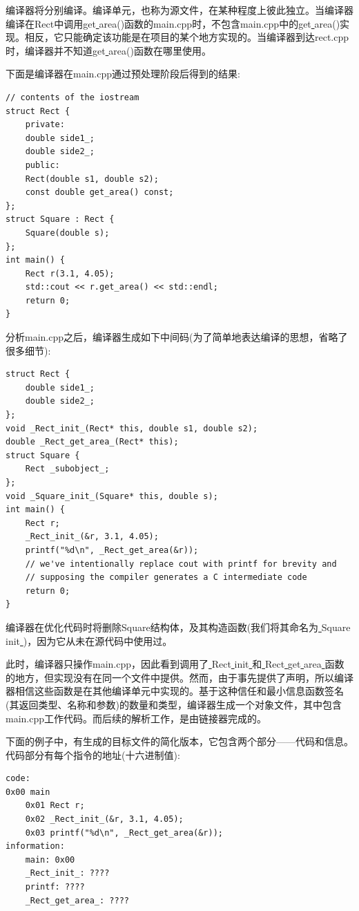 编译器将分别编译。编译单元，也称为源文件，在某种程度上彼此独立。当编译器编译在Rect中调用get\underline{ }area()函数的main.cpp时，不包含main.cpp中的get\underline{ }area()实现。相反，它只能确定该功能是在项目的某个地方实现的。当编译器到达rect.cpp时，编译器并不知道get\underline{ }area()函数在哪里使用。\par
下面是编译器在main.cpp通过预处理阶段后得到的结果: \par

\begin{lstlisting}[caption={}]
// contents of the iostream
struct Rect {
	private:
	double side1_;
	double side2_;
	public:
	Rect(double s1, double s2);
	const double get_area() const;
};
struct Square : Rect {
	Square(double s);
};
int main() {
	Rect r(3.1, 4.05);
	std::cout << r.get_area() << std::endl;
	return 0;
}
\end{lstlisting}

分析main.cpp之后，编译器生成如下中间码(为了简单地表达编译的思想，省略了很多细节): \par

\begin{lstlisting}[caption={}]
struct Rect {
	double side1_;
	double side2_;
};
void _Rect_init_(Rect* this, double s1, double s2);
double _Rect_get_area_(Rect* this);
struct Square {
	Rect _subobject_;
};
void _Square_init_(Square* this, double s);
int main() {
	Rect r;
	_Rect_init_(&r, 3.1, 4.05);
	printf("%d\n", _Rect_get_area(&r));
	// we've intentionally replace cout with printf for brevity and
	// supposing the compiler generates a C intermediate code
	return 0;
}
\end{lstlisting}

编译器在优化代码时将删除Square结构体，及其构造函数(我们将其命名为\underline{ }Square\underline{ }init\underline{ })，因为它从未在源代码中使用过。 \par
此时，编译器只操作main.cpp，因此看到调用了\underline{ }Rect\underline{ }init\underline{ }和\underline{ }Rect\underline{ }get\underline{ }area\underline{ }函数的地方，但实现没有在同一个文件中提供。然而，由于事先提供了声明，所以编译器相信这些函数是在其他编译单元中实现的。基于这种信任和最小信息函数签名(其返回类型、名称和参数)的数量和类型，编译器生成一个对象文件，其中包含main.cpp工作代码。而后续的解析工作，是由链接器完成的。 \par
下面的例子中，有生成的目标文件的简化版本，它包含两个部分——代码和信息。代码部分有每个指令的地址(十六进制值): \par

\begin{lstlisting}[caption={}]
code:
0x00 main
	0x01 Rect r;
	0x02 _Rect_init_(&r, 3.1, 4.05);
	0x03 printf("%d\n", _Rect_get_area(&r));
information:
	main: 0x00
	_Rect_init_: ????
	printf: ????
	_Rect_get_area_: ????
\end{lstlisting}

